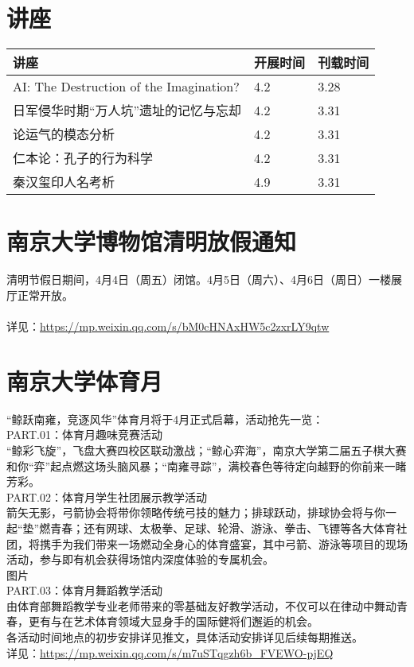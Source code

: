 \documentclass[letterpaper, 12pt]{article}
\begin{document}
\begin{multicols}{2}
\pagebreak

\section{讲座}
\begin{tabular}{|>{\centering\arraybackslash}m{}|m{}|m{}|}
    \hline
    讲座 & 开展时间 & 刊载时间\\
    \hline\hline
    AI: The Destruction of the Imagination? & 4.2 & 3.28\\\hline
    日军侵华时期“万人坑”遗址的记忆与忘却 & 4.2 & 3.31\\\hline
    论运气的模态分析 & 4.2 & 3.31\\\hline
    仁本论：孔子的行为科学 & 4.2 & 3.31\\\hline
    秦汉玺印人名考析 & 4.9 & 3.31\\\hline
\end{tabular}


\section{南京大学博物馆清明放假通知}
清明节假日期间，4月4日（周五）闭馆。4月5日（周六）、4月6日（周日）一楼展厅正常开放。
\\
\\详见：\url{https://mp.weixin.qq.com/s/bM0cHNAxHW5c2zxrLY9qtw}

\section{南京大学体育月}
“鲸跃南雍，竞逐风华”体育月将于4月正式启幕，活动抢先一览：
\\PART.01：体育月趣味竞赛活动
\\“鲸彩飞旋”，飞盘大赛四校区联动激战；“鲸心弈海”，南京大学第二届五子棋大赛和你“弈”起点燃这场头脑风暴；“南雍寻踪”，满校春色等待定向越野的你前来一睹芳彩。
\\PART.02：体育月学生社团展示教学活动
\\箭矢无影，弓箭协会将带你领略传统弓技的魅力；排球跃动，排球协会将与你一起“垫”燃青春；还有网球、太极拳、足球、轮滑、游泳、拳击、飞镖等各大体育社团，将携手为我们带来一场燃动全身心的体育盛宴，其中弓箭、游泳等项目的现场活动，参与即有机会获得场馆内深度体验的专属机会。
\\图片
\\PART.03：体育月舞蹈教学活动
\\由体育部舞蹈教学专业老师带来的零基础友好教学活动，不仅可以在律动中舞动青春，更有与在艺术体育领域大显身手的国际健将们邂逅的机会。
\\各活动时间地点的初步安排详见推文，具体活动安排详见后续每期推送。
\\详见：\url{https://mp.weixin.qq.com/s/m7uSTqgzh6b_FVEWO-pjEQ}





\end{multicols}
\end{document}
